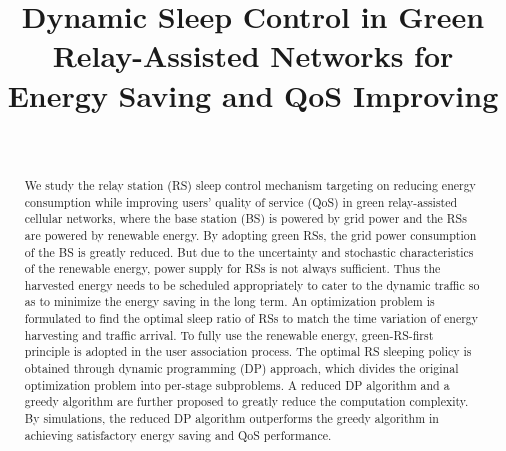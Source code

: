 \documentclass[conference]{IEEEtran}
\begin{document}
\title{Dynamic Sleep Control in Green Relay-Assisted Networks for Energy Saving and QoS Improving}

\author{\\
\vspace{-0.2cm}
}
\maketitle

\begin{abstract}
  We study the relay station (RS) sleep control mechanism targeting on reducing energy consumption while improving users' quality of service (QoS) in green relay-assisted cellular networks, where the base station (BS) is powered by grid power and the RSs are powered by renewable energy. By adopting green RSs, the grid power consumption of the BS is greatly reduced. But due to the uncertainty and stochastic characteristics of the renewable energy, power supply for RSs is not always sufficient. Thus the harvested energy needs to be scheduled appropriately to cater to the dynamic traffic so as to minimize the energy saving in the long term. An optimization problem is formulated to find the optimal sleep ratio of RSs to match the time variation of energy harvesting and traffic arrival. To fully use the renewable energy, green-RS-first principle is adopted in the user association process. The optimal RS sleeping policy is obtained through dynamic programming (DP) approach, which divides the original optimization problem into per-stage subproblems. A reduced DP algorithm and a greedy algorithm are further proposed to greatly reduce the computation complexity. By simulations, the reduced DP algorithm outperforms the greedy algorithm in achieving satisfactory energy saving and QoS performance.
\end{abstract}

\IEEEpeerreviewmaketitle
\end{document}
